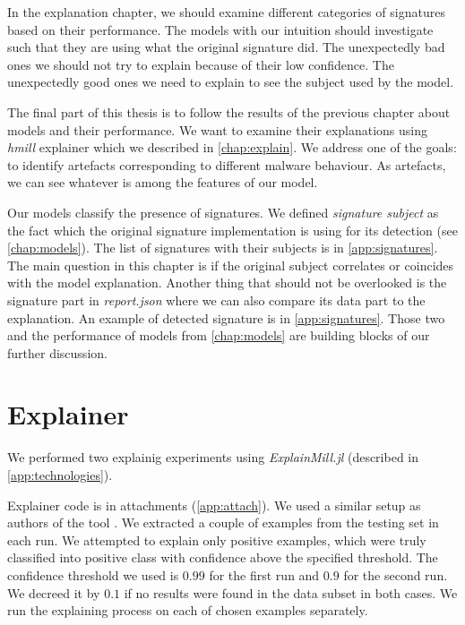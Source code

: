 
In the explanation chapter, we should examine different categories of signatures based on their performance. The models with our intuition should investigate such that they are using what the original signature did. The unexpectedly bad ones we should not try to explain because of their low confidence. The unexpectedly good ones we need to explain to see the subject used by the model.



The final part of this thesis is to follow the results of the previous chapter about models and their performance. We want to examine their explanations using \emph{hmill} explainer \cite{Pevny2020} which we described in \ref{chap:explain}. We address one of the goals: to identify artefacts corresponding to different malware behaviour. As artefacts, we can see whatever is among the features of our model. 

Our models classify the presence of signatures. We defined \emph{signature subject} as the fact which the original signature implementation is using for its detection (see \ref{chap:models}). The list of signatures with their subjects is in \ref{app:signatures}. The main question in this chapter is if the original subject correlates or coincides with the model explanation. Another thing that should not be overlooked is the signature part in \emph{report.json} where we can also compare its data part to the explanation. An example of detected signature is in \ref{app:signatures}. Those two and the performance of models from \ref{chap:models} are building blocks of our further discussion.

\section{Explainer}
We performed two explainig experiments using \emph{ExplainMill.jl} (described in \ref{app:technologies}). 

Explainer code is in attachments (\ref{app:attach}). We used a similar setup as authors of the tool \cite{Pevny2020}. We extracted a couple of examples from the testing set in each run. We attempted to explain only positive examples, which were truly classified into positive class with confidence above the specified threshold. The confidence threshold we used is $0.99$ for the first run and $0.9$ for the second run. We decreed it by $0.1$ if no results were found in the data subset in both cases. We run the explaining process on each of chosen examples separately.

